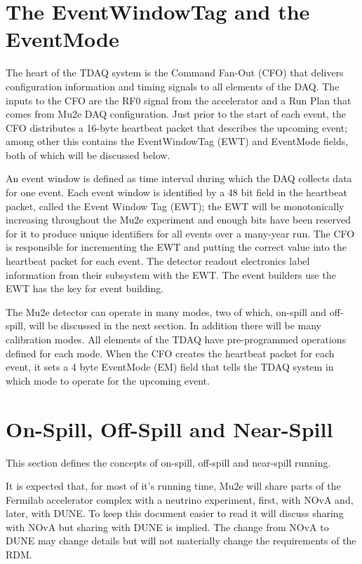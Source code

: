 \section{The EventWindowTag and the EventMode}
\label{sec:EWTagAndEventMode}

The heart of the TDAQ system is the Command Fan-Out (CFO) that delivers
configuration information and timing signals to all elements of the DAQ.
The inputs to the CFO are the RF0 signal from the accelerator
and a Run Plan that comes from Mu2e DAQ configuration.
Just prior to the start of each event,
the CFO distributes a 16-byte heartbeat packet that describes the upcoming event\cite{PacketProtocols};
among other this contains the EventWindowTag (EWT) and EventMode fields,
both of which will be discussed below.

An event window is defined as time interval during which the DAQ collects data for one event.
Each event window is identified by a 48 bit field in the heartbeat packet, called
the Event Window Tag (EWT);
the EWT will be monotonically increasing throughout the Mu2e experiment and
enough bits have been reserved for it to produce unique identifiers for all
events over a many-year run.
The CFO is responsible for incrementing the EWT and putting the correct value into
the heartbeat packet for each event.
The detector readout electronics label information from their subsystem with the EWT.
The event builders use the EWT has the key for event building.

The Mu2e detector can operate in many modes, two of which,
on-spill and off-spill, will be discussed in the next section.
In addition there will be many calibration modes.
All elements of the TDAQ have pre-programmed operations defined for each mode.
When the CFO creates the heartbeat packet for each event,
it sets a 4 byte EventMode (EM) field
that tells the TDAQ system in which mode to operate for the upcoming event.

\section{On-Spill, Off-Spill and Near-Spill}

This section defines the concepts of on-spill, off-spill and near-spill running.

It is expected that, for most of it's running time,
Mu2e will share parts of the Fermilab accelerator complex with a neutrino experiment,
first, with NOvA and, later, with DUNE.
To keep this document easier to read it will discuss sharing with NOvA but sharing with DUNE is implied.
The change from NOvA to DUNE may change details
but will not materially change the requirements of the RDM.

